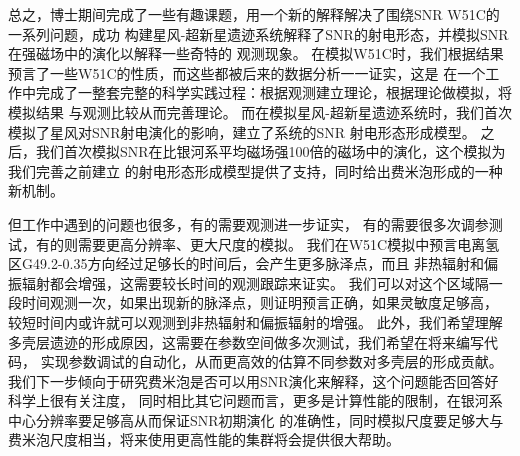 总之，博士期间完成了一些有趣课题，用一个新的解释解决了围绕SNR W51C的一系列问题，成功
构建星风-超新星遗迹系统解释了SNR的射电形态，并模拟SNR在强磁场中的演化以解释一些奇特的
观测现象。
在模拟W51C时，我们根据结果预言了一些W51C的性质，而这些都被后来的数据分析一一证实，这是
在一个工作中完成了一整套完整的科学实践过程：根据观测建立理论，根据理论做模拟，将模拟结果
与观测比较从而完善理论。
而在模拟星风-超新星遗迹系统时，我们首次模拟了星风对SNR射电演化的影响，建立了系统的SNR
射电形态形成模型。
之后，我们首次模拟SNR在比银河系平均磁场强100倍的磁场中的演化，这个模拟为我们完善之前建立
的射电形态形成模型提供了支持，同时给出费米泡形成的一种新机制。

但工作中遇到的问题也很多，有的需要观测进一步证实，
有的需要很多次调参测试，有的则需要更高分辨率、更大尺度的模拟。
我们在W51C模拟中预言电离氢区G49.2-0.35方向经过足够长的时间后，会产生更多脉泽点，而且
非热辐射和偏振辐射都会增强，这需要较长时间的观测跟踪来证实。
我们可以对这个区域隔一段时间观测一次，如果出现新的脉泽点，则证明预言正确，如果灵敏度足够高，
较短时间内或许就可以观测到非热辐射和偏振辐射的增强。
此外，我们希望理解多壳层遗迹的形成原因，这需要在参数空间做多次测试，我们希望在将来编写代码，
实现参数调试的自动化，从而更高效的估算不同参数对多壳层的形成贡献。
我们下一步倾向于研究费米泡是否可以用SNR演化来解释，这个问题能否回答好科学上很有关注度，
同时相比其它问题而言，更多是计算性能的限制，在银河系中心分辨率要足够高从而保证SNR初期演化
的准确性，同时模拟尺度要足够大与费米泡尺度相当，将来使用更高性能的集群将会提供很大帮助。
